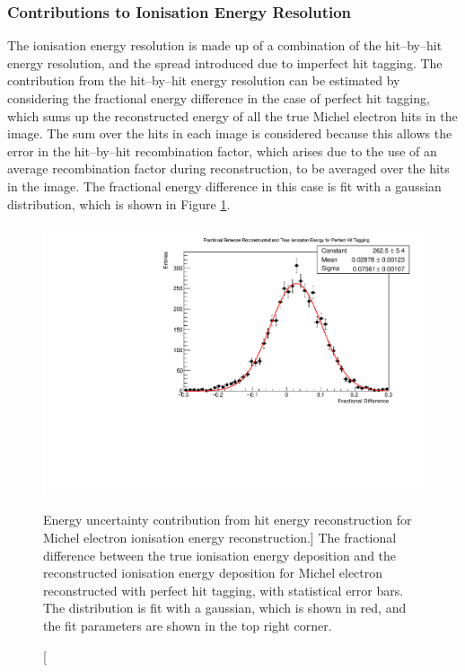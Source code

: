\subsubsection*{Contributions to Ionisation Energy Resolution}
The ionisation energy resolution is made up of a combination of the hit--by--hit
energy resolution, and the spread introduced due to imperfect hit tagging. The
contribution from the hit--by--hit energy resolution can be estimated by
considering the fractional energy difference in the case of perfect hit tagging,
which sums up the reconstructed energy of all the true Michel electron hits in
the image. The sum over the hits in each image is considered because this
allows the error in the hit--by--hit recombination factor, which arises due to
the use of an average recombination factor during reconstruction, to be
averaged over the hits in the image. The fractional energy difference in this
case is fit with a gaussian distribution, which is shown in Figure
\ref{fig:michel_hit_res}.
\begin{figure}
	\centering
	\includegraphics[width=\textwidth]{figures/michel_hit_energy_resolution.pdf}
	\caption
	[Energy uncertainty contribution from hit energy reconstruction for Michel
	electron ionisation energy reconstruction.]
	{The fractional difference between the true ionisation energy deposition and
	the reconstructed ionisation energy deposition for Michel electron
	reconstructed with perfect hit tagging, with statistical error bars. The
	distribution is fit with a gaussian, which is shown in red, and the fit
	parameters are shown in the top right corner.}
	\label{fig:michel_hit_res}
\end{figure}

